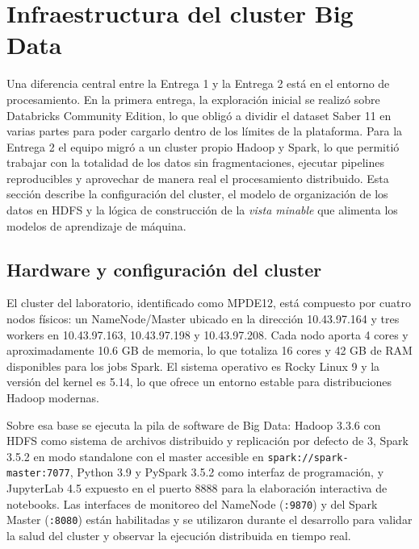 \section{Infraestructura del cluster Big Data}
Una diferencia central entre la Entrega 1 y la Entrega 2 está en el entorno de procesamiento. En la primera entrega, la exploración inicial se realizó sobre Databricks Community Edition, lo que obligó a dividir el dataset Saber 11 en varias partes para poder cargarlo dentro de los límites de la plataforma. Para la Entrega 2 el equipo migró a un cluster propio Hadoop y Spark, lo que permitió trabajar con la totalidad de los datos sin fragmentaciones, ejecutar pipelines reproducibles y aprovechar de manera real el procesamiento distribuido. Esta sección describe la configuración del cluster, el modelo de organización de los datos en HDFS y la lógica de construcción de la \textit{vista minable} que alimenta los modelos de aprendizaje de máquina.

\subsection{Hardware y configuración del cluster}
El cluster del laboratorio, identificado como MPDE12, está compuesto por cuatro nodos físicos: un NameNode/Master ubicado en la dirección 10.43.97.164 y tres workers en 10.43.97.163, 10.43.97.198 y 10.43.97.208. Cada nodo aporta 4 cores y aproximadamente 10.6 GB de memoria, lo que totaliza 16 cores y 42 GB de RAM disponibles para los jobs Spark. El sistema operativo es Rocky Linux 9 y la versión del kernel es 5.14, lo que ofrece un entorno estable para distribuciones Hadoop modernas.

Sobre esa base se ejecuta la pila de software de Big Data: Hadoop 3.3.6 con HDFS como sistema de archivos distribuido y replicación por defecto de 3, Spark 3.5.2 en modo standalone con el master accesible en \texttt{spark://spark-master:7077}, Python 3.9 y PySpark 3.5.2 como interfaz de programación, y JupyterLab 4.5 expuesto en el puerto 8888 para la elaboración interactiva de notebooks. Las interfaces de monitoreo del NameNode (\texttt{:9870}) y del Spark Master (\texttt{:8080}) están habilitadas y se utilizaron durante el desarrollo para validar la salud del cluster y observar la ejecución distribuida en tiempo real.

